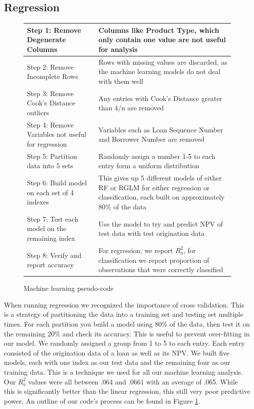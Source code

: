 \documentclass[12 pt]{uncw_thesis}
\theoremstyle{plain}
\theoremstyle{remark}
\theoremstyle{definition}
\begin{document}
\subsection{Regression}
\begin{figure}
\begin{center}
	\begin{tabular}{|M{5.5cm}|M{8.75cm}|}
		\hline
		Step 1: Remove Degenerate Columns & Columns like Product Type, which only contain one value are not useful for analysis\\
		\hline
		Step 2: Remove Incomplete Rows & Rows with missing values are discarded, as the machine learning models do not deal with them well\\
		\hline
		Step 3: Remove Cook's Distance outliers & Any entries with Cook's Distance greater than 4/n are removed\\
		\hline
		Step 4: Remove Variables not useful for regression & Variables such as Loan Sequence Number and Borrower Number are removed\\
		\hline
		Step 5: Partition data into 5 sets & Randomly assign a number 1-5 to each entry form a uniform distribution\\
		\hline
		Step 6: Build model on each set of 4 indexes & This gives up 5 different models of either RF or RGLM for either regression or classification, each built on approximately 80\% of the data\\
		\hline
		Step 7: Test each model on the remaining index & Use the model to try and predict NPV of test data with test origination data\\
		\hline
		Step 8: Verify and report accuracy & For regression, we report \(R_a^2\), for classification we report proportion of observations that were correctly classified\\ 
		\hline
	\end{tabular}
\end{center}
\caption{Machine learning pseudo-code} \label{fig:MLCode}
\end{figure}
When running regression we recognized the importance of cross validation. This is a strategy of partitioning the data into a training set and testing set multiple times. For each partition you build a model using 80\% of the data, then test it on the remaining 20\% and check its accuracy. This is useful to prevent over-fitting in our model. We randomly assigned a group from 1 to 5 to each entry. Each entry consisted of the origination data of a loan as well as its NPV. We built five models, each with one index as our test data and the remaining four as our training data. This is a technique we used for all our machine learning analysis. Our \(R_a^2\) values were all between .064 and .0661 with an average of .065. While this is significantly better than the linear regression, this still very poor predictive power. An outline of our code's process can be found in Figure \ref{fig:MLCode}.
\end{document}
